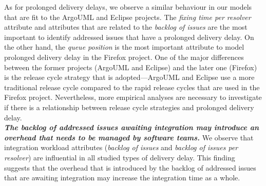 As for prolonged delivery delays, we observe a similar behaviour in our models that
are fit to the ArgoUML and Eclipse projects. The \textit{fixing time per
resolver} attribute and attributes that are related to the \textit{backlog of
issues} are the most important to identify addressed issues that have a
prolonged delivery delay. On the other hand, the \textit{queue position} is the most
important attribute to model prolonged delivery delay in the Firefox project. One of
the major differences between the former projects (ArgoUML and Eclipse) and the
later one (Firefox) is the release cycle strategy that is adopted---ArgoUML and
Eclipse use a more traditional release cycle compared to the rapid release
cycles that are used in the Firefox project. Nevertheless, more empirical
analyses are necessary to investigate if there is a relationship between release
cycle strategies and prolonged delivery delay.\\

\noindent\textbf{\textit{The backlog of addressed issues awaiting integration
may introduce an overhead that needs to be managed by software teams.}} We
observe that integration workload attributes (\eg \textit{backlog of issues} and
\textit{backlog of issues per resolver}) are influential in all studied types of
delivery delay. This finding suggests that the overhead that is introduced by
the backlog of addressed issues that are awaiting integration may increase the
integration time as a whole. 

